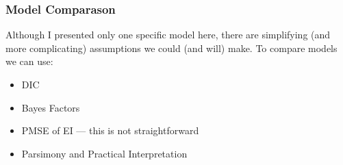 \documentclass[handout]{beamer}\usepackage[]{graphicx}\usepackage[]{color}
\begin{document}
\begin{frame}
\frametitle{Model Comparason}
Although I presented only one specific model here, there are simplifying (and more complicating) assumptions we could (and will) make. To compare models we can use:

\begin{itemize}
\item
DIC
\item 
Bayes Factors
\item
PMSE of EI --- this is not straightforward
\item
Parsimony and Practical Interpretation
\end{itemize}

\end{frame}

\end{document}
